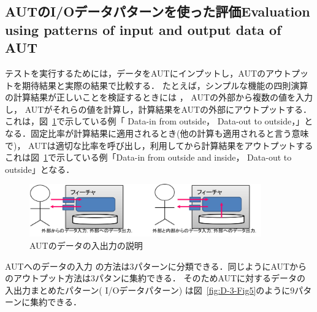 \documentclass[a4paper,11pt]{jreport}
\begin{document}
\subsection{AUTのI/Oデータパターンを使った評価Evaluation using patterns of input and output data of AUT}


 テストを実行するためには，データをAUTにインプットし，AUTのアウトプットを期待結果と実際の結果で比較する．
 たとえば，シンプルな機能の四則演算の計算結果が正しいことを検証するときには ， AUTの外部から複数の値を入力し， AUTがそれらの値を計算し，計算結果をAUTの外部にアウトプットする．
 これは，図~\ref{fig:D-3-Fig4}で示している例「 Data-in from outside， Data-out to outside，」となる．固定比率が計算結果に適用されるとき(他の計算も適用されると言う意味で)， AUTは適切な比率を呼び出し，利用してから計算結果をアウトプットするこれは図~\ref{fig:D-3-Fig4}で示している例「Data-in from outside 	and  inside， Data-out to outside」となる．

 \begin{figure}[h]
  \begin{center}
  \includegraphics[width=10cm]{./image/D-3-Fig4.png}
  \caption{AUTのデータの入出力の説明}
  \label{fig:D-3-Fig4}
  \end{center}
   \end{figure}


AUTへのデータの入力 の方法は3パターンに分類できる．同じようにAUTからのアウトプット方法は3パタンに集約できる．  そのためAUTに対するデータの入出力まとめたパターン( I/Oデータパターン) は図~\ref{fig:D-3-Fig5}のように9パターンに集約できる．
\end{document}
